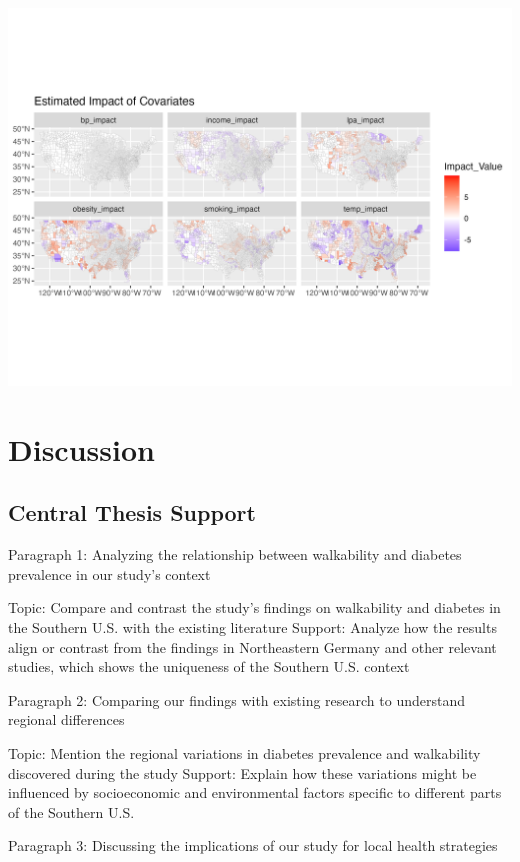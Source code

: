 \documentclass[
]{article}
\begin{document}
\begin{center}
\includegraphics{facet_plot.png}
\end{center}

\section{Discussion}\label{discussion}

\subsection{Central Thesis Support}\label{central-thesis-support-3}

Paragraph 1: Analyzing the relationship between walkability and diabetes
prevalence in our study's context

Topic: Compare and contrast the study's findings on walkability and
diabetes in the Southern U.S. with the existing literature Support:
Analyze how the results align or contrast from the findings in
Northeastern Germany and other relevant studies, which shows the
uniqueness of the Southern U.S. context

Paragraph 2: Comparing our findings with existing research to understand
regional differences

Topic: Mention the regional variations in diabetes prevalence and
walkability discovered during the study Support: Explain how these
variations might be influenced by socioeconomic and environmental
factors specific to different parts of the Southern U.S.

Paragraph 3: Discussing the implications of our study for local health
strategies
\end{document}
